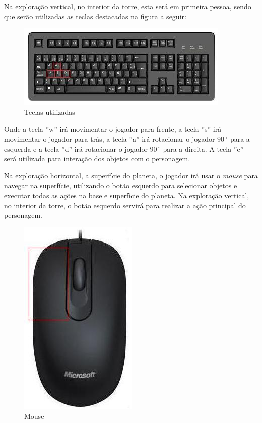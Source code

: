 \documentclass[11pt]{article} %
\begin{document}
Na exploração vertical, no interior da torre, esta será em primeira pessoa, sendo que serão utilizadas as teclas destacadas na figura a seguir:\\

\begin{figure}[!htp]
\centering
\includegraphics[scale=0.75]{res/keyboard.jpg}
\caption{Teclas utilizadas}
\label{Teclado}
\end{figure}

Onde a tecla ''w'' irá movimentar o jogador para frente, a tecla ''s'' irá movimentar o jogador para trás, a tecla ''a'' irá rotacionar o jogador $90\,^{\circ}$ para a esquerda e a tecla ''d'' irá rotacionar o jogador $90\,^{\circ}$ para a direita. A tecla ''e'' será utilizada para interação dos objetos com o personagem.

Na exploração horizontal, a superfície do planeta, o jogador irá usar o \textit{mouse} para navegar na superfície, utilizando o botão esquerdo para selecionar objetos e executar todas as ações na base e superfície do planeta. Na exploração vertical, no interior da torre, o botão esquerdo servirá para realizar a ação principal do personagem.

\begin{figure}[!htp]
\centering
\includegraphics[scale=0.4]{res/mouse.jpg}
\caption{Mouse}
\label{Mouse}
\end{figure}
\end{document}
